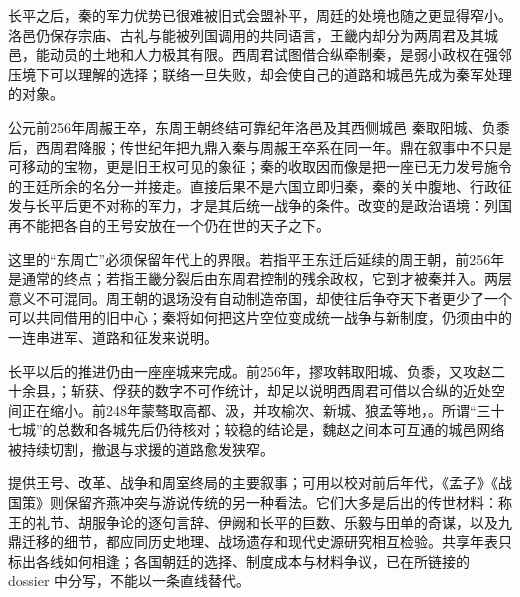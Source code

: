 长平之后，秦的军力优势已很难被旧式会盟补平，周廷的处境也随之更显得窄小。洛邑仍保存宗庙、古礼与能被列国调用的共同语言，王畿内却分为两周君及其城邑，能动员的土地和人力极其有限。西周君试图借合纵牵制秦，是弱小政权在强邻压境下可以理解的选择；联络一旦失败，却会使自己的道路和城邑先成为秦军处理的对象。

\begin{event}{公元前256年}{周赧王卒，东周王朝终结}{可靠纪年}{洛邑及其西侧城邑}
秦取阳城、负黍后，西周君降服；传世纪年把九鼎入秦与周赧王卒系在同一年。鼎在叙事中不只是可移动的宝物，更是旧王权可见的象征；秦的收取因而像是把一座已无力发号施令的王廷所余的名分一并接走。直接后果不是六国立即归秦，秦的关中腹地、行政征发与长平后更不对称的军力，才是其后统一战争的条件。改变的是政治语境：列国再不能把各自的王号安放在一个仍在世的天子之下。

这里的“东周亡”必须保留年代上的界限。若指平王东迁后延续的周王朝，前256年是通常的终点；若指王畿分裂后由东周君控制的残余政权，它到才被秦并入。两层意义不可混同。周王朝的退场没有自动制造帝国，却使往后争夺天下者更少了一个可以共同借用的旧中心；秦将如何把这片空位变成统一战争与新制度，仍须由中的一连串进军、道路和征发来说明。
\end{event}

长平以后的推进仍由一座座城来完成。前256年，摎攻韩取阳城、负黍，又攻赵二十余县，；斩获、俘获的数字不可作统计，却足以说明西周君可借以合纵的近处空间正在缩小。前248年蒙骜取高都、汲，并攻榆次、新城、狼孟等地，。所谓“三十七城”的总数和各城先后仍待核对；较稳的结论是，魏赵之间本可互通的城邑网络被持续切割，撤退与求援的道路愈发狭窄。

\begin{sourcenote}[这段共享年表怎样读]
提供王号、改革、战争和周室终局的主要叙事；可用以校对前后年代，《孟子》《战国策》则保留齐燕冲突与游说传统的另一种看法。它们大多是后出的传世材料：称王的礼节、胡服争论的逐句言辞、伊阙和长平的巨数、乐毅与田单的奇谋，以及九鼎迁移的细节，都应同历史地理、战场遗存和现代史源研究相互检验。共享年表只标出各线如何相逢；各国朝廷的选择、制度成本与材料争议，已在所链接的 dossier 中分写，不能以一条直线替代。
\end{sourcenote}
